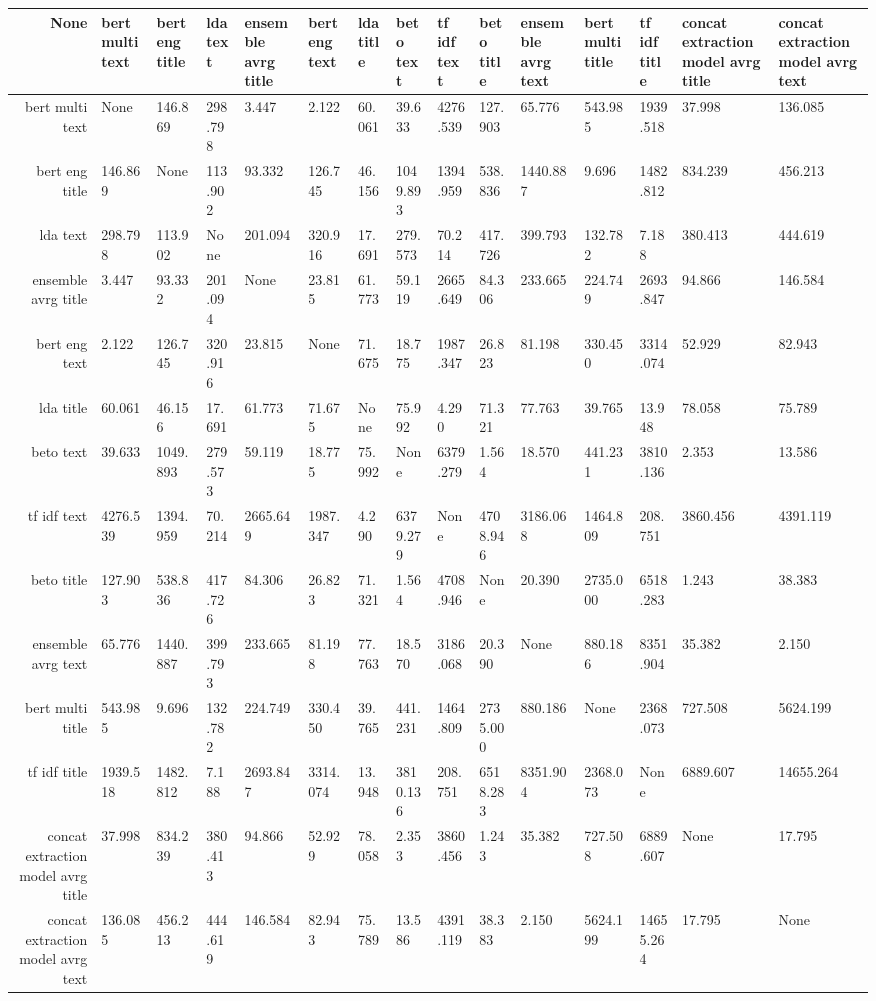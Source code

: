 \begin{tabular}{|r|l|l|l|l|l|l|l|l|l|l|l|l|l|l|}
  \hline
  None & bert multi text & bert eng title & lda text & ensemble avrg title & bert eng text & lda title & beto text & tf idf text & beto title & ensemble avrg text & bert multi title & tf idf title & concat extraction model avrg title & concat extraction model avrg text \\ 
  \hline
  bert multi text & None & 146.869 & 298.798 & 3.447 & 2.122 & 60.061 & 39.633 & 4276.539 & 127.903 & 65.776 & 543.985 & 1939.518 & 37.998 & 136.085 \\ 
  \hline
  bert eng title & 146.869 & None & 113.902 & 93.332 & 126.745 & 46.156 & 1049.893 & 1394.959 & 538.836 & 1440.887 & 9.696 & 1482.812 & 834.239 & 456.213 \\ 
  \hline
  lda text & 298.798 & 113.902 & None & 201.094 & 320.916 & 17.691 & 279.573 & 70.214 & 417.726 & 399.793 & 132.782 & 7.188 & 380.413 & 444.619 \\ 
  \hline
  ensemble avrg title & 3.447 & 93.332 & 201.094 & None & 23.815 & 61.773 & 59.119 & 2665.649 & 84.306 & 233.665 & 224.749 & 2693.847 & 94.866 & 146.584 \\ 
  \hline
  bert eng text & 2.122 & 126.745 & 320.916 & 23.815 & None & 71.675 & 18.775 & 1987.347 & 26.823 & 81.198 & 330.450 & 3314.074 & 52.929 & 82.943 \\ 
  \hline
  lda title & 60.061 & 46.156 & 17.691 & 61.773 & 71.675 & None & 75.992 & 4.290 & 71.321 & 77.763 & 39.765 & 13.948 & 78.058 & 75.789 \\ 
  \hline
  beto text & 39.633 & 1049.893 & 279.573 & 59.119 & 18.775 & 75.992 & None & 6379.279 & 1.564 & 18.570 & 441.231 & 3810.136 & 2.353 & 13.586 \\ 
  \hline
  tf idf text & 4276.539 & 1394.959 & 70.214 & 2665.649 & 1987.347 & 4.290 & 6379.279 & None & 4708.946 & 3186.068 & 1464.809 & 208.751 & 3860.456 & 4391.119 \\ 
  \hline
  beto title & 127.903 & 538.836 & 417.726 & 84.306 & 26.823 & 71.321 & 1.564 & 4708.946 & None & 20.390 & 2735.000 & 6518.283 & 1.243 & 38.383 \\ 
  \hline
  ensemble avrg text & 65.776 & 1440.887 & 399.793 & 233.665 & 81.198 & 77.763 & 18.570 & 3186.068 & 20.390 & None & 880.186 & 8351.904 & 35.382 & 2.150 \\ 
  \hline
  bert multi title & 543.985 & 9.696 & 132.782 & 224.749 & 330.450 & 39.765 & 441.231 & 1464.809 & 2735.000 & 880.186 & None & 2368.073 & 727.508 & 5624.199 \\ 
  \hline
  tf idf title & 1939.518 & 1482.812 & 7.188 & 2693.847 & 3314.074 & 13.948 & 3810.136 & 208.751 & 6518.283 & 8351.904 & 2368.073 & None & 6889.607 & 14655.264 \\ 
  \hline
  concat extraction model avrg title & 37.998 & 834.239 & 380.413 & 94.866 & 52.929 & 78.058 & 2.353 & 3860.456 & 1.243 & 35.382 & 727.508 & 6889.607 & None & 17.795 \\ 
  \hline
  concat extraction model avrg text & 136.085 & 456.213 & 444.619 & 146.584 & 82.943 & 75.789 & 13.586 & 4391.119 & 38.383 & 2.150 & 5624.199 & 14655.264 & 17.795 & None \\ 
  \hline
\end{tabular}
